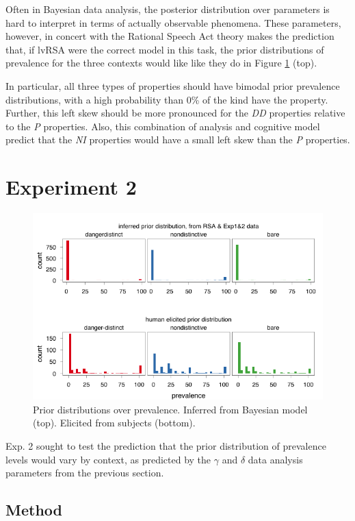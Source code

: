 \documentclass[10pt,letterpaper]{article}
\begin{document}
Often in Bayesian data analysis, the posterior distribution over parameters is hard to interpret in terms of actually observable phenomena. These parameters, however, in concert with the Rational Speech Act theory makes the prediction that, if lvRSA were the correct model in this task, the prior distributions of prevalence for the three contexts would like like they do in Figure \ref{fig:modeldatapriors} (top). 

In particular, all three types of properties should have bimodal prior prevalence distributions, with a high probability than 0\% of the kind have the property. Further, this left skew should be more pronounced for the \emph{DD} properties relative to the \emph{P} properties. Also, this combination of analysis and cognitive model predict that the \emph{NI} properties would have a small left skew than the \emph{P} properties.


\section{Experiment 2}

\begin{figure}
\centering
    \includegraphics[width=\columnwidth]{exp3hist_inferredMeanPriorExp1_2}
    \caption{Prior distributions over prevalence. Inferred from Bayesian model (top). Elicited from subjects (bottom).}
  \label{fig:modeldatapriors}
\end{figure}

Exp. 2 sought to test the prediction that the prior distribution of prevalence levels would vary by context, as predicted by the $\gamma$ and $\delta$ data analysis parameters from the previous section.

\subsection{Method}
\end{document}
